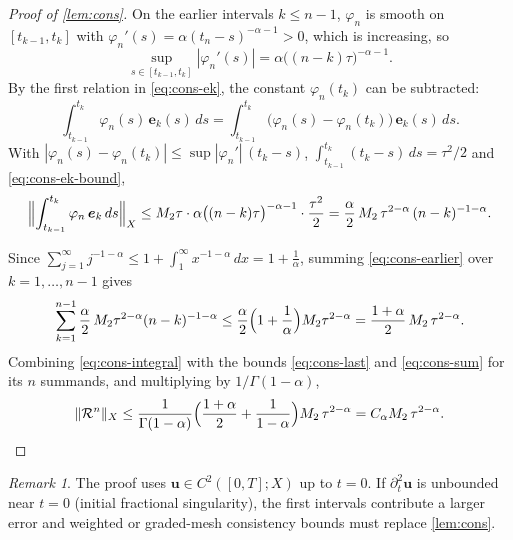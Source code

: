 \documentclass[11pt,a4paper]{article}
\numberwithin{equation}{section}
\theoremstyle{plain}
\theoremstyle{definition}
\theoremstyle{remark}
\newtheorem{remark}[theorem]{Remark}
\begin{document}
\begin{proof}[Proof of \eqref{lem:cons}]
On the earlier intervals $k\le n-1$, $\varphi_n$ is smooth on $[t_{k-1},t_k]$ with $\varphi_n'(s)=\alpha(t_n-s)^{-\alpha-1}>0$, which is increasing, so
\[
\sup_{s\in[t_{k-1},t_k]}|\varphi_n'(s)|=\alpha\bigl((n-k)\tau\bigr)^{-\alpha-1}.
\]
By the first relation in \eqref{eq:cons-ek}, the constant $\varphi_n(t_k)$ can be subtracted:
\[
\int_{t_{k-1}}^{t_k}\varphi_n(s)\,\bm e_k(s)\,ds=\int_{t_{k-1}}^{t_k}\bigl(\varphi_n(s)-\varphi_n(t_k)\bigr)\,\bm e_k(s)\,ds .
\]
With $|\varphi_n(s)-\varphi_n(t_k)|\le\sup|\varphi_n'|\,(t_k-s)$, $\int_{t_{k-1}}^{t_k}(t_k-s)\,ds=\tau^2/2$ and \eqref{eq:cons-ek-bound},
\begin{equation}\label{eq:cons-earlier}
\Bigl\|\int_{t_{k-1}}^{t_k}\varphi_n\,\bm e_k\,ds\Bigr\|_X\le M_2\tau\cdot\alpha\bigl((n-k)\tau\bigr)^{-\alpha-1}\cdot\frac{\tau^2}2=\frac\alpha2\,M_2\,\tau^{2-\alpha}\,(n-k)^{-1-\alpha}.
\end{equation}

Since $\sum_{j=1}^{\infty}j^{-1-\alpha}\le1+\int_1^\infty x^{-1-\alpha}\,dx=1+\frac1\alpha$, summing \eqref{eq:cons-earlier} over $k=1,\dots,n-1$ gives
\begin{equation}\label{eq:cons-sum}
\sum_{k=1}^{n-1}\frac\alpha2\,M_2\tau^{2-\alpha}(n-k)^{-1-\alpha}\le\frac\alpha2\Bigl(1+\frac1\alpha\Bigr)M_2\tau^{2-\alpha}=\frac{1+\alpha}2\,M_2\,\tau^{2-\alpha}.
\end{equation}
Combining \eqref{eq:cons-integral} with the bounds \eqref{eq:cons-last} and \eqref{eq:cons-sum} for its $n$ summands, and multiplying by $1/\Gamma(1-\alpha)$,
\[
\|\mathcal R^n\|_X\le\frac1{\Gamma(1-\alpha)}\Bigl(\frac{1+\alpha}2+\frac1{1-\alpha}\Bigr)M_2\,\tau^{2-\alpha}=C_\alpha M_2\,\tau^{2-\alpha}. \qedhere
\]
\end{proof}


\begin{remark}
The proof uses $\bm u\in C^2([0,T];X)$ up to $t=0$. If $\partial_t^2\bm u$ is unbounded near $t=0$ (initial fractional singularity), the first intervals contribute a larger error and weighted or graded-mesh consistency bounds must replace \eqref{lem:cons}.
\end{remark}
\end{document}
